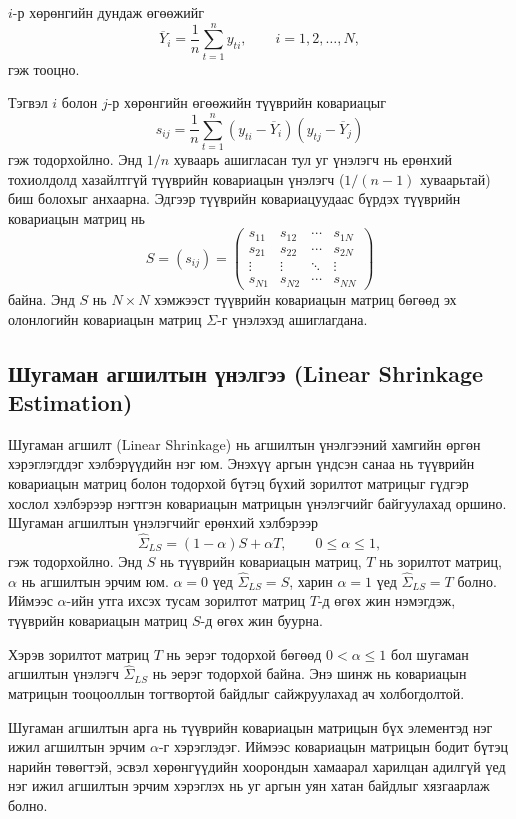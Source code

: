 $i$-р хөрөнгийн дундаж өгөөжийг 
\[
\overline{Y}_i
=
\frac{1}{n}
\sum_{t=1}^{n}y_{ti},
\qquad
i=1,2,\ldots,N,
\]
гэж тооцно.

Тэгвэл $i$ болон $j$-р хөрөнгийн өгөөжийн түүврийн ковариацыг
\[
s_{ij}
=
\frac{1}{n}
\sum_{t=1}^{n}
(y_{ti}-\overline{Y}_i)
(y_{tj}-\overline{Y}_j)
\]
гэж тодорхойлно. Энд $1/n$ хуваарь ашигласан тул уг үнэлэгч нь
ерөнхий тохиолдолд хазайлтгүй түүврийн ковариацын үнэлэгч
($1/(n-1)$ хуваарьтай) биш болохыг анхаарна.
Эдгээр түүврийн ковариацуудаас бүрдэх
түүврийн ковариацын матриц нь
\[
S
=
(s_{ij})
=
\begin{pmatrix}
	s_{11} & s_{12} & \cdots & s_{1N}\\
	s_{21} & s_{22} & \cdots & s_{2N}\\
	\vdots & \vdots & \ddots & \vdots\\
	s_{N1} & s_{N2} & \cdots & s_{NN}
\end{pmatrix}
\]
байна. Энд $S$ нь $N\times N$ хэмжээст түүврийн ковариацын матриц бөгөөд эх олонлогийн ковариацын матриц $\Sigma$-г үнэлэхэд ашиглагдана.


\subsection{Шугаман агшилтын үнэлгээ (Linear Shrinkage Estimation)}

Шугаман агшилт (Linear Shrinkage) нь агшилтын үнэлгээний
хамгийн өргөн хэрэглэгддэг хэлбэрүүдийн нэг юм. Энэхүү аргын
үндсэн санаа нь түүврийн ковариацын матриц болон тодорхой
бүтэц бүхий зорилтот матрицыг гүдгэр хослол хэлбэрээр нэгтгэн
ковариацын матрицын үнэлэгчийг байгуулахад оршино. Шугаман
агшилтын үнэлэгчийг ерөнхий хэлбэрээр
\[
\widehat{\Sigma}_{LS}
=
(1-\alpha)S+\alpha T,
\qquad
0\leq\alpha\leq1,
\]
гэж тодорхойлно. Энд $S$ нь түүврийн ковариацын матриц,
$T$ нь зорилтот матриц, $\alpha$ нь агшилтын эрчим юм.
$\alpha=0$ үед $\widehat{\Sigma}_{LS}=S$, харин $\alpha=1$
үед $\widehat{\Sigma}_{LS}=T$ болно. Иймээс $\alpha$-ийн
утга ихсэх тусам зорилтот матриц $T$-д өгөх жин нэмэгдэж,
түүврийн ковариацын матриц $S$-д өгөх жин буурна.

Хэрэв зорилтот матриц $T$ нь эерэг тодорхой бөгөөд
$0<\alpha\leq1$ бол шугаман агшилтын үнэлэгч
$\widehat{\Sigma}_{LS}$ нь эерэг тодорхой байна. Энэ шинж нь
ковариацын матрицын тооцооллын тогтвортой байдлыг сайжруулахад
ач холбогдолтой.

Шугаман агшилтын арга нь түүврийн ковариацын матрицын бүх
элементэд нэг ижил агшилтын эрчим $\alpha$-г хэрэглэдэг.
Иймээс ковариацын матрицын бодит бүтэц нарийн төвөгтэй,
эсвэл хөрөнгүүдийн хоорондын хамаарал харилцан адилгүй үед
нэг ижил агшилтын эрчим хэрэглэх нь уг аргын уян хатан
байдлыг хязгаарлаж болно.


